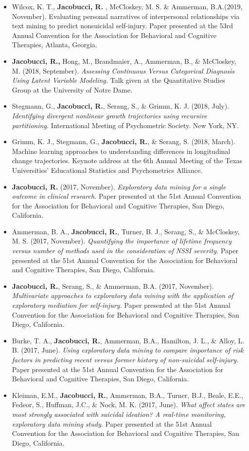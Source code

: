 \documentclass[letterpaper,10pt]{article}
\begin{document}
\begin{itemize}
	\item[] Wilcox, K. T., \textbf{Jacobucci, R.} , McCloskey, M. S. \& Ammerman, B.A.(2019, November). Evaluating personal narratives of interpersonal relationships via text mining to predict nonsuicidal self-injury. Paper presented at the 53rd Annual Convention for the Association for Behavioral and Cognitive Therapies, Atlanta, Georgia.
	\item[]\textbf{Jacobucci, R.,} Hong, M., Brandmaier, A., Ammerman, B., \& McCloskey, M. (2018, September). \emph{Assessing Continuous Versus Categorical Diagnosis Using Latent Variable Modeling.} Talk given at the Quantitative Studies Group at the University of Notre Dame.
	\item[]Stegmann, G., \textbf{Jacobucci, R.}, Serang, S., \& Grimm, K. J. (2018, July). \emph{Identifying divergent nonlinear growth trajectories using recursive partitioning.} International Meeting of Psychometric Society. New York, NY.
	\item[]Grimm, K. J., Stegmann, G., \textbf{Jacobucci, R.}, \& Serang, S. (2018, March). Machine learning approaches to understanding differences in longitudinal change trajectories. Keynote address at the 6th Annual Meeting of the Texas Universities' Educational Statistics and Psychometrics Alliance.
	\item[]\textbf{Jacobucci, R.} (2017, November). \emph{Exploratory data mining for a single outcome in clinical research.} Paper presented at the 51st Annual Convention for the Association for Behavioral and Cognitive Therapies, San Diego, California.
	\item[]Ammerman, B. A., \textbf{Jacobucci, R.}, Turner, B. J., Serang, S., \& McCloskey, M. S. (2017, November). \emph{Quantifying the importance of lifetime frequency versus number of methods used in the consideration of NSSI severity.} Paper presented at the 51st Annual Convention for the Association for Behavioral and Cognitive Therapies, San Diego, California.
	\item[]\textbf{Jacobucci, R.}, Serang, S., \& Ammerman, B.A. (2017, November). \emph{Multivariate approaches to exploratory data mining with the application of exploratory mediation for self-injury.} Paper presented at the 51st Annual Convention for the Association for Behavioral and Cognitive Therapies, San Diego, California.
	\item[]Burke, T. A., \textbf{Jacobucci, R.}, Ammerman, B.A., Hamilton, J. L., \& Alloy, L. B. (2017, June). \emph{Using exploratory data mining to compare importance of risk factors in predicting recent versus former history of non-suicidal self-injury.} Paper presented at the 51st Annual Convention for the Association for Behavioral and Cognitive Therapies, San Diego, California.
	\item[] Kleiman, E.M., \textbf{Jacobucci, R.}, Ammerman, B.A., Turner, B.J., Beale, E.E., Fedeor, S., Huffman, J.C., \& Nock, M. K. (2017, June). \emph{What affect states are most strongly associated with suicidal ideation? A real-time monitoring, exploratory data mining study.} Paper presented at the 51st Annual Convention for the Association for Behavioral and Cognitive Therapies, San Diego, California.
	

\end{itemize}
\end{document}
